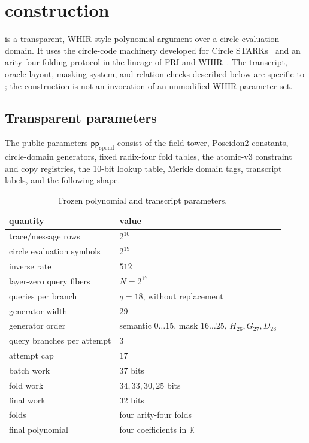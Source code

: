 \section{\Profile{} construction}
\label{sec:construction}

\Profile{} is a transparent, WHIR-style polynomial argument over a circle
evaluation domain.  It uses the circle-code machinery developed for Circle
STARKs~\cite{HaboeckLevitPapini2024} and an arity-four folding protocol in the
lineage of FRI and WHIR~\cite{BenSassonBentovHoreshRiabzev2018FRI,ArnonChiesaFenziYogev2025WHIR}.
The transcript, oracle layout, masking system, and relation checks described
below are specific to \Profile{}; the construction is not an invocation of an
unmodified WHIR parameter set.

\subsection{Transparent parameters}

\begin{definition}
\label{def:spend-transparent-parameters}
The public parameters \(\mathsf{pp}_{\mathrm{spend}}\) consist of the field tower,
Poseidon2 constants, circle-domain generators, fixed radix-four fold tables,
the atomic-v3 constraint and copy registries, the 10-bit lookup table, Merkle
domain tags, transcript labels, and the following shape.
\end{definition}

\begin{table}[t]
\centering
\caption{Frozen \Profile{} polynomial and transcript parameters.}
\label{tab:spend-parameters}
\begin{tabular}{@{}ll@{}}
\toprule
quantity & value \\
\midrule
trace/message rows & \(2^{10}\) \\
circle evaluation symbols & \(2^{19}\) \\
inverse rate & \(512\) \\
layer-zero query fibers & \(N=2^{17}\) \\
queries per branch & \(q=18\), without replacement \\
generator width & \(29\) \\
generator order & semantic \(0\ldots15\), mask \(16\ldots25\), \(H_{26},G_{27},D_{28}\) \\
query branches per attempt & \(3\) \\
attempt cap & \(17\) \\
batch work & \(37\) bits \\
fold work & \(34,33,30,25\) bits \\
final work & \(32\) bits \\
folds & four arity-four folds \\
final polynomial & four coefficients in \(\mathbb K\) \\
\bottomrule
\end{tabular}
\end{table}

